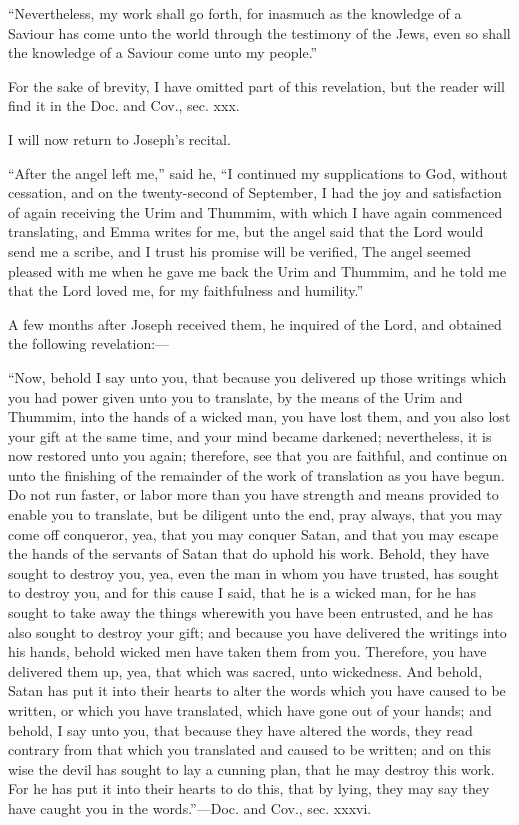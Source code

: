 		``Nevertheless, my work shall go forth, for inasmuch as the knowledge of a Saviour has come unto the world through the testimony of the Jews, even so shall the knowledge of a Saviour come unto my people.''

		For the sake of brevity, I have omitted part of this revelation, but the reader will find it in the Doc. and Cov., sec. xxx.

		I will now return to Joseph's recital.

		``After the angel left me,'' said he, ``I continued my supplications to God, without cessation, and on the twenty-second of September, I had the joy and satisfaction of again receiving the Urim and Thummim, with which I have again commenced translating, and Emma writes for me, but the angel said that the Lord would send me a scribe, and I trust his promise will be verified, The angel seemed pleased with me when he gave me back the Urim and Thummim, and he told me that the Lord loved me, for my faithfulness and humility.''

		A few months after Joseph received them, he inquired of the Lord, and obtained the following revelation:---

		``Now, behold I say unto you, that because you delivered up those writings which you had power given unto you to translate, by the means of the Urim and Thummim, into the hands of a wicked man, you have lost them, and you also lost your gift at the same time, and your mind became darkened; nevertheless, it is now restored unto you again; therefore, see that you are faithful, and continue on unto the finishing of the remainder of the work of translation as you have begun. Do not run faster, or labor more than you have strength and means provided to enable you to translate, but be diligent unto the end, pray always, that you may come off conqueror, yea, that you may conquer Satan, and that you may escape the hands of the servants of Satan that do uphold his work. Behold, they have sought to destroy you, yea, even the man in whom you have trusted, has sought to destroy you, and for this cause I said, that he is a wicked man, for he has sought to take away the things wherewith you have been entrusted, and he has also sought to destroy your gift; and because you have delivered the writings into his hands, behold wicked men have taken them from you. Therefore, you have delivered them up, yea, that which was sacred, unto wickedness. And behold, Satan has put it into their hearts to alter the words which you have caused to be written, or which you have translated, which have gone out of your hands; and behold, I say unto you, that because they have altered the words, they read contrary from that which you translated and caused to be written; and on this wise the devil has sought to lay a cunning plan, that he may destroy this work. For he has put it into their hearts to do this, that by lying, they may say they have caught you in the words.''---Doc. and Cov., sec. xxxvi.
		
